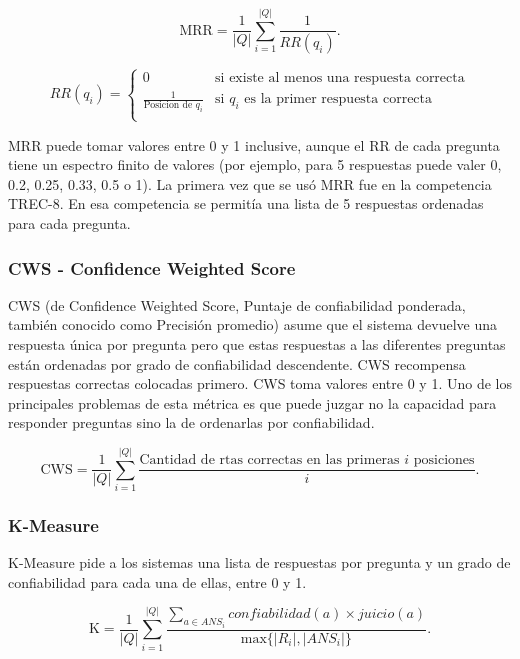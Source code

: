 \begin{equation}\label{eq:mrr}
 \text{MRR} = \frac{1}{|Q|} \sum_{i=1}^{|Q|} \frac{1}{RR(q_i)}. \!
\end{equation}

\begin{equation*}
    RR(q_i) = \begin{cases}
               0     & \text{si existe al menos una respuesta correcta}\\
               \frac{1}{\text{Posicion de }q_i} & \text{si }q_i\text{ es la primer respuesta correcta}\\
           \end{cases}
\end{equation*}

MRR puede tomar valores entre 0 y 1 inclusive, aunque el RR de cada pregunta tiene un espectro finito de valores (por ejemplo, para 5 respuestas puede valer 0, 0.2, 0.25, 0.33, 0.5 o 1). La primera vez que se usó MRR fue en la competencia TREC-8. En esa competencia se permitía una lista de 5 respuestas ordenadas para cada pregunta.  


\subsubsection*{CWS - Confidence Weighted Score}
CWS (de Confidence Weighted Score, Puntaje de confiabilidad ponderada, también conocido como Precisión promedio) asume que el sistema devuelve una respuesta única por pregunta pero que estas respuestas a las diferentes preguntas están ordenadas por grado de confiabilidad descendente. 
CWS recompensa respuestas correctas colocadas primero. CWS toma valores entre 0 y 1.  Uno de los principales problemas de esta métrica es que puede juzgar no la capacidad para responder preguntas sino la de ordenarlas por confiabilidad.

\begin{equation}\label{eq:cws}
 \text{CWS} = \frac{1}{|Q|} \sum_{i=1}^{|Q|} \frac{\text{Cantidad de rtas correctas en las primeras $i$ posiciones}}{i}. \!
\end{equation}

 
\subsubsection*{K-Measure}
K-Measure pide a los sistemas una lista de respuestas por pregunta y un grado de confiabilidad para cada una de ellas, entre 0 y 1. 

\begin{equation}\label{eq:k}
 \text{K} = \frac{1}{|Q|} \sum_{i=1}^{|Q|} \frac{\sum_{a \in ANS_i} confiabilidad(a) \times juicio(a)}{\text{max}\{|R_i|, |ANS_i|\}}. \!
\end{equation}

